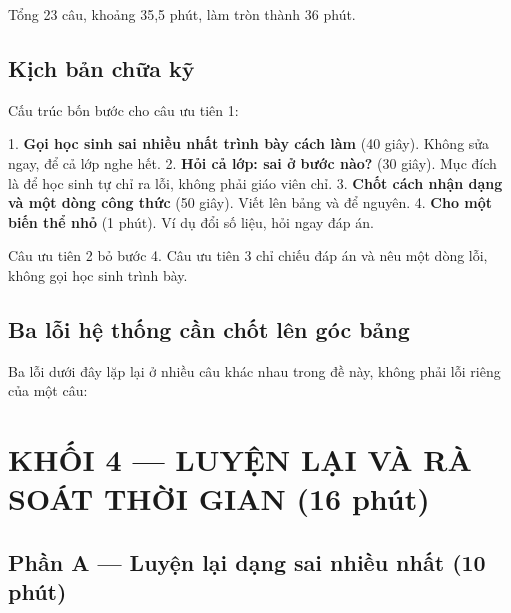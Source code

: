 \documentclass[11pt, a4paper]{article}
\begin{document}
Tổng 23 câu, khoảng 35,5 phút, làm tròn thành 36 phút.

\subsection{Kịch bản chữa kỹ}

Cấu trúc bốn bước cho câu ưu tiên 1:

1. \textbf{Gọi học sinh sai nhiều nhất trình bày cách làm} (40 giây). Không sửa ngay, để cả lớp nghe hết.
2. \textbf{Hỏi cả lớp: sai ở bước nào?} (30 giây). Mục đích là để học sinh tự chỉ ra lỗi, không phải giáo viên chỉ.
3. \textbf{Chốt cách nhận dạng và một dòng công thức} (50 giây). Viết lên bảng và để nguyên.
4. \textbf{Cho một biến thể nhỏ} (1 phút). Ví dụ đổi số liệu, hỏi ngay đáp án.

Câu ưu tiên 2 bỏ bước 4. Câu ưu tiên 3 chỉ chiếu đáp án và nêu một dòng lỗi, không gọi học sinh trình bày.

\subsection{Ba lỗi hệ thống cần chốt lên góc bảng}

Ba lỗi dưới đây lặp lại ở nhiều câu khác nhau trong đề này, không phải lỗi riêng của một câu:


\section{KHỐI 4 — LUYỆN LẠI VÀ RÀ SOÁT THỜI GIAN (16 phút)}

\subsection{Phần A — Luyện lại dạng sai nhiều nhất (10 phút)}
\end{document}
